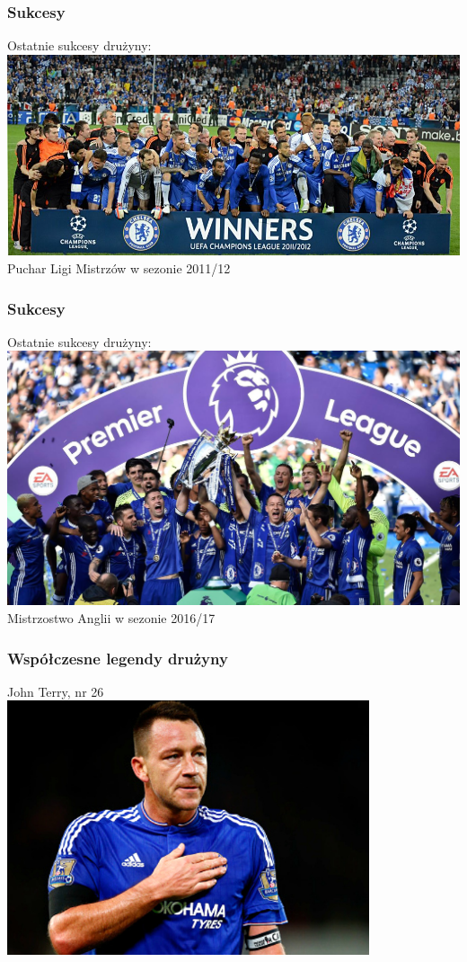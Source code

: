 \documentclass[]{beamer}
\begin{document}
\frame
{
	\frametitle{Sukcesy}
	\begin{block}
		{Ostatnie sukcesy drużyny:}
		\centering
		\includegraphics[width=1\textwidth]{cl.jpg}
		\newline Puchar Ligi Mistrzów w sezonie 2011/12
	\end{block}
}
\frame
{
	\frametitle{Sukcesy}
	\begin{block}
		{Ostatnie sukcesy drużyny:}
		\centering
		\includegraphics[width=1\textwidth]{pl.jpg}
		\newline Mistrzostwo Anglii w sezonie 2016/17
	\end{block}
}
\frame
{
	\frametitle{Współczesne legendy drużyny}
	\begin{block}
		{John Terry, nr 26}
		\centering
		\includegraphics[width=0.8\textwidth]{jt.jpg}
	\end{block}
}
\end{document}

